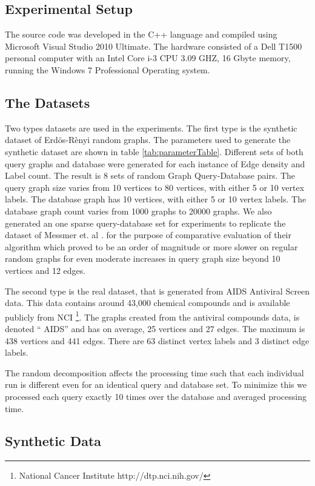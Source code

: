 \subsection{Experimental Setup}
The source code was developed in the C++ language and compiled using Microsoft Visual Studio 2010 Ultimate. The hardware consisted of a Dell T1500 personal computer with an
Intel Core i-3 CPU 3.09 GHZ, 16 Gbyte memory, running the Windows 7 Professional Operating system.

\subsection{The Datasets}

Two types datasets are used in the experiments. The first type is the synthetic dataset of Erd\"{o}s-R\`{e}nyi random graphs. The parameters used to generate the synthetic dataset are shown in table \ref{tab:parameterTable}. Different sets of both query graphs and database were generated for each instance of Edge density and Label count. The result is 8 sets of random Graph Query-Database pairs. The query graph size varies from 10 vertices to 80 vertices, with either 5 or 10 vertex labels. The database graph has 10 vertices, with either 5 or 10 vertex labels. The database graph count varies from 1000 graphs to 20000 graphs. We also generated an one sparse query-database set for experiments to replicate the dataset of Messmer et. al \cite{messmer_bunke2000}. for the purpose of comparative evaluation of their algorithm which proved to be an order of magnitude or more slower on regular random graphs for even moderate increases in query graph size beyond 10 vertices and 12 edges.

The second type is the real dataset, that is generated from AIDS Antiviral Screen data. This data contains around 43,000 chemical compounds and is available publicly from NCI \footnote{National Cancer Institute http://dtp.nci.nih.gov/}. The graphs created from the antiviral compounds data, is denoted `` AIDS'' and has on average, 25 vertices and 27 edges. The maximum is 438 vertices and 441 edges. There are 63 distinct vertex labels and 3 distinct edge labels.

The random decomposition affects the processing time such that each individual run is different even for an identical query and database set. To minimize this we processed each query exactly 10 times over the database and averaged processing time.

\subsection{Synthetic Data}


